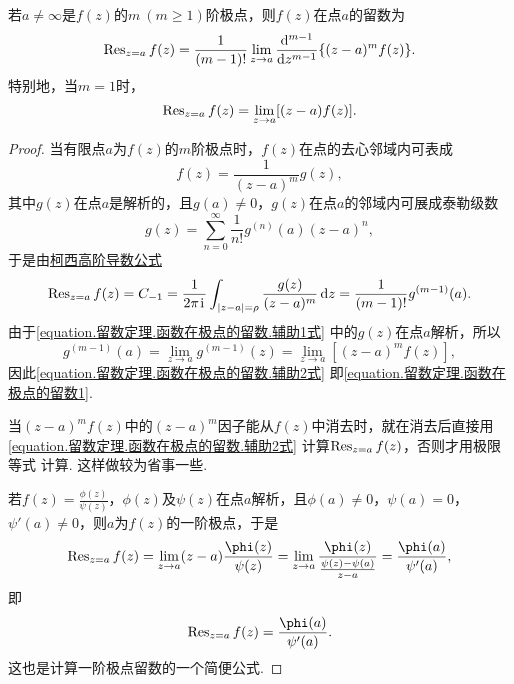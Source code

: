 \begin{property}
若\(a\neq\infty\)是\(f(z)\)的\(m\ (m\geq1)\)阶极点，则\(f(z)\)在点\(a\)的留数为\begin{equation}\label{equation.留数定理.函数在极点的留数1}
\operatorname{Res}_{z=a} f(z)
= \frac{1}{(m-1)!} \lim_{z \to a} \dv[m-1]{z} \{ (z-a)^m f(z) \}.
\end{equation}
特别地，当\(m=1\)时，\begin{equation}\label{equation.留数定理.函数在极点的留数2}
\operatorname{Res}_{z=a} f(z)
= \lim_{z \to a} [(z-a) f(z)].
\end{equation}
\begin{proof}
当有限点\(a\)为\(f(z)\)的\(m\)阶极点时，\(f(z)\)在点的去心邻域内可表成\begin{equation}\label{equation.留数定理.函数在极点的留数.辅助1式}
f(z) = \frac{1}{(z-a)^m} g(z),
\end{equation}
其中\(g(z)\)在点\(a\)是解析的，且\(g(a)\neq0\)，\(g(z)\)在点\(a\)的邻域内可展成泰勒级数\[
g(z) = \sum_{n=0}^\infty \frac{1}{n!} g^{(n)}(a) (z-a)^n,
\]于是由\hyperref[equation:解析函数的积分表示.柯西高阶导数公式]{柯西高阶导数公式}\begin{equation}\label{equation.留数定理.函数在极点的留数.辅助2式}
\operatorname{Res}_{z=a} f(z) = C_{-1}
= \frac{1}{2\pi\kern1pt\mathrm{i}\kern1pt} \int_{\abs{z-a}=\rho} \frac{g(z)}{(z-a)^m} \dd{z}
= \frac{1}{(m-1)!} g^{(m-1)}(a).
\end{equation}由于\cref{equation.留数定理.函数在极点的留数.辅助1式} 中的\(g(z)\)在点\(a\)解析，所以\[
g^{(m-1)}(a) = \lim_{z \to a} g^{(m-1)}(z)
= \lim_{z \to a} [(z-a)^m f(z)],
\]因此\cref{equation.留数定理.函数在极点的留数.辅助2式} 即\cref{equation.留数定理.函数在极点的留数1}.

当\((z-a)^m f(z)\)中的\((z-a)^m\)因子能从\(f(z)\)中消去时，就在消去后直接用\cref{equation.留数定理.函数在极点的留数.辅助2式} 计算\(\operatorname{Res}_{z=a} f(z)\)，否则才用极限等式  计算.
这样做较为省事一些.

若\(f(z) = \frac{\phi(z)}{\psi(z)}\)，\(\phi(z)\)及\(\psi(z)\)在点\(a\)解析，且\(\phi(a)\neq0\)，\(\psi(a)=0\)，\(\psi'(a)\neq0\)，则\(a\)为\(f(z)\)的一阶极点，于是\[
\Res_{z=a} f(z)
= \lim_{z \to a} (z-a) \frac{\phi(z)}{\psi(z)}
= \lim_{z \to a} \frac{\phi(z)}{\frac{\psi(z)-\psi(a)}{z-a}}
= \frac{\phi(a)}{\psi'(a)},
\]即\begin{equation}\label{equation.留数定理.函数在极点的留数3}
\Res_{z=a} f(z)
= \frac{\phi(a)}{\psi'(a)}.
\end{equation}
这也是计算一阶极点留数的一个简便公式.
\end{proof}
\end{property}

